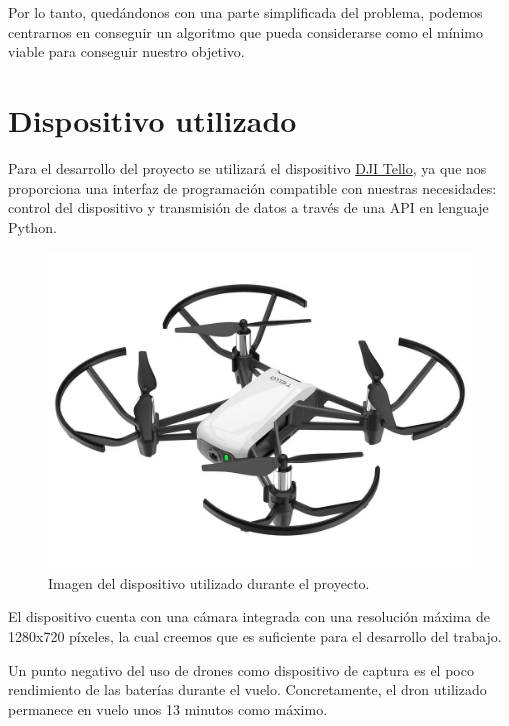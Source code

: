 Por lo tanto, quedándonos con una parte simplificada del problema, podemos centrarnos en conseguir un algoritmo que pueda considerarse como el mínimo viable para conseguir nuestro objetivo.
\medskip

\section{Dispositivo utilizado}
\label{dispositivo-utilizado}

Para el desarrollo del proyecto se utilizará el dispositivo \href{https://store.dji.com/de/shop/tello-series}{DJI Tello}, ya que nos proporciona una interfaz de programación compatible con nuestras necesidades: control del dispositivo y transmisión de datos a través de una API en lenguaje Python.
\medskip


\begin{figure}[ht!]
  \centering
  \includegraphics[scale=0.2]{figuras/dispositivo_utilizado.png}
  \caption[DJI Tello. Dispositivo utilizado durante el proyecto]{Imagen del dispositivo utilizado durante el proyecto.}
  \label{fig-dron}
\end{figure}


El dispositivo cuenta con una cámara integrada con una resolución máxima de 1280x720 píxeles, la cual creemos que es suficiente para el desarrollo del trabajo.
\medskip

Un punto negativo del uso de drones como dispositivo de captura es el poco rendimiento de las baterías durante el vuelo. Concretamente, el dron utilizado permanece en vuelo unos 13 minutos como máximo.
\medskip

